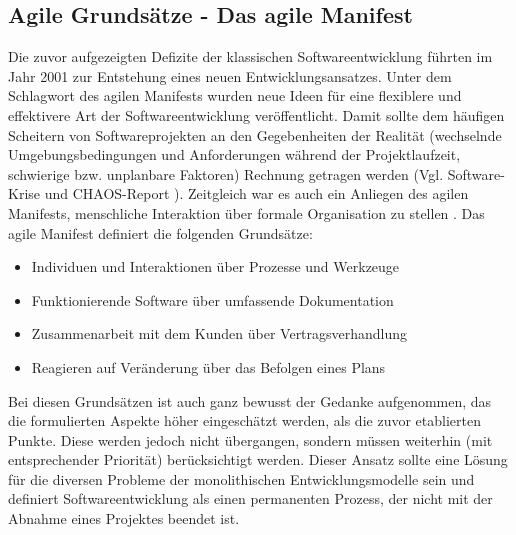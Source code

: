 \subsection{Agile Grundsätze - Das agile Manifest}
\label{Agile Grundsaetze - Das agile Manifest}
Die zuvor aufgezeigten Defizite der klassischen Softwareentwicklung führten im Jahr 2001 zur Entstehung eines neuen Entwicklungsansatzes. Unter dem Schlagwort des agilen Manifests wurden neue Ideen für eine flexiblere und effektivere Art der Softwareentwicklung veröffentlicht. Damit sollte dem häufigen Scheitern von Softwareprojekten an den Gegebenheiten der Realität (wechselnde Umgebungsbedingungen und Anforderungen während der Projektlaufzeit, schwierige bzw. unplanbare Faktoren) Rechnung getragen werden (Vgl. \glqq{}Software-Krise\grqq{} und CHAOS-Report \cite{noauthor_standish_1995}). Zeitgleich war es auch ein Anliegen des agilen Manifests, menschliche Interaktion über formale Organisation zu stellen \cite{beck_manifest_2001}.
Das agile Manifest definiert die folgenden Grundsätze:
\begin{itemize}
    \item Individuen und Interaktionen über Prozesse und Werkzeuge
    \item Funktionierende Software über umfassende Dokumentation
    \item Zusammenarbeit mit dem Kunden über Vertragsverhandlung
    \item Reagieren auf Veränderung über das Befolgen eines Plans
\end{itemize}
Bei diesen Grundsätzen ist auch ganz bewusst der Gedanke aufgenommen, das die formulierten Aspekte höher eingeschätzt werden, als die zuvor etablierten Punkte. Diese werden jedoch nicht übergangen, sondern müssen weiterhin (mit entsprechender Priorität) berücksichtigt werden.
Dieser Ansatz sollte eine Lösung für die diversen Probleme der monolithischen Entwicklungsmodelle sein und definiert Softwareentwicklung als einen permanenten Prozess, der nicht mit der Abnahme eines Projektes beendet ist.